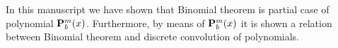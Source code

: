 In this manuscript we have shown that Binomial theorem is partial case of polynomial ${\mathbf{P}}\sp{m} \sb{b}(x)$.
Furthermore, by means of ${\mathbf{P}}\sp{m} \sb{b}(x)$ it is shown a relation between Binomial theorem
and discrete convolution of polynomials.
